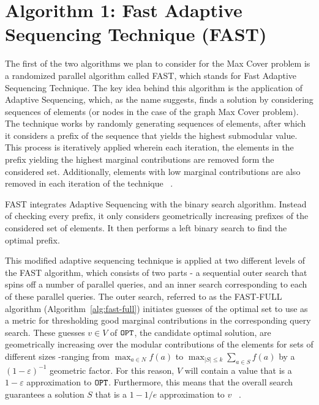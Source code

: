 \documentclass[11pt, a4paper]{article}
\begin{document}

\section{Algorithm 1: Fast Adaptive Sequencing Technique (\textsc{FAST})} 
The first of the two algorithms we plan to consider for the Max Cover problem is a randomized parallel algorithm called FAST, which stands for Fast Adaptive Sequencing Technique. The key idea behind this algorithm is the application of Adaptive Sequencing, which, as the name suggests, finds a solution by considering sequences of elements (or nodes in the case of the graph Max Cover problem). The technique works by randomly generating sequences of elements, after which it considers a prefix of the sequence that yields the highest submodular value. This process is iteratively applied wherein each iteration, the elements in the prefix yielding the highest marginal contributions are removed form the considered set. Additionally, elements with low marginal contributions are also removed in each iteration of the technique ~\cite{breuer2019fast}.    

FAST integrates Adaptive Sequencing with the binary search algorithm. Instead of checking every prefix, it only considers geometrically increasing prefixes of the considered set of elements. It then performs a left binary search to find the optimal prefix.

This modified adaptive sequencing technique is applied at two different levels of the FAST algorithm, which consists of two parts - a sequential outer search that spins off a number of parallel queries, and an inner search corresponding to each of these parallel queries. The outer search, referred to as the \textsc{FAST-FULL} algorithm (Algorithm~\ref{alg:fast-full}) initiates guesses of the optimal set to use as a metric for thresholding good marginal contributions in the corresponding query search. These guesses $v \in V$ of $\texttt{OPT}$, the candidate optimal solution, are geometrically increasing over the modular contributions of the elements for sets of different sizes -ranging from $\max_{a \in N} f(a)$ to $\max_{|S| \leq k} \sum_{a \in S} f(a)$ by a $(1 - \varepsilon)^{-1}$ geometric factor. For this reason, $V$ will contain a value that is a $1- \varepsilon$ approximation to $\texttt{OPT}$. Furthermore, this means that the overall search guarantees a solution $S$ that is a $1-1/e$ approximation to $v$ ~\cite{breuer2019fast}.
\end{document}
